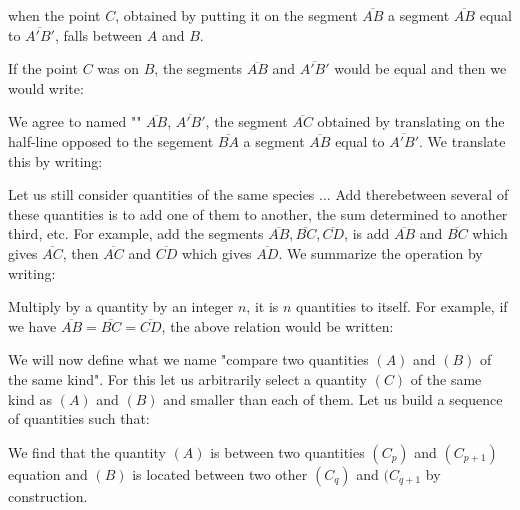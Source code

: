 	when the point $C$, obtained by putting it on the segment $\overline{AB}$ a segment  $\overline{AB}$ equal to $\overline{A'B'}$, falls between $A$ and $B$.
	
	If the point $C$ was on $B$, the segments $\overline{AB}$ and $\overline{A'B'}$  would be equal and then we would write:
	
	We agree to named "" $\overline{AB}$, $\overline{A'B'}$, the segment $\overline{AC}$ obtained by translating on the half-line opposed to the segement $\overline{BA}$ a segment $\overline{AB}$ equal to $\overline{A'B'}$. We translate this by writing:
	
	Let us still consider quantities of the same species ... Add therebetween several of these quantities is to add one of them to another, the sum determined to another third, etc. For example, add the segments $\overline{AB}, \overline{BC}, \overline{CD}$, is add $\overline{AB}$ and $\overline{BC}$ which gives $\overline{AC}$, then $\overline{AC}$ and $\overline{CD}$ which gives $\overline{AD}$. We summarize the operation by writing:
	
	Multiply by a quantity by an integer $n$, it is $n$ quantities to itself. For example, if we have $\overline{AB} = \overline{BC} =\overline{CD}$, the above relation would be written:
	
	We will now define what we name "compare two quantities $(A)$ and $(B)$ of the same kind". For this let us arbitrarily select a quantity $(C)$ of the same kind as $(A)$ and $(B)$ and smaller than each of them. Let us build a sequence of quantities such that:
	
	We find that the quantity $(A)$ is between two quantities $(C_p)$ and $(C_{p+1})$ equation and $(B)$ is located between two other $(C_q)$ and $(C_{q+1}$ by construction.
	
